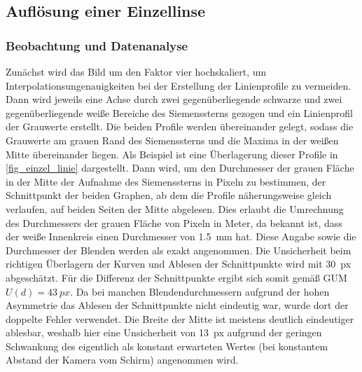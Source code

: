 \documentclass[
	a4paper,
	12pt,
	pagesize,
	ngerman
]{scrartcl}
\begin{document}
	\subsection{Auflösung einer Einzellinse} \label{ss_einzellinse}
	\subsubsection{Beobachtung und Datenanalyse}
	Zunächst wird das Bild um den Faktor vier hochskaliert, um Interpolationsungenauigkeiten bei der Erstellung der Linienprofile zu vermeiden.
	Dann wird jeweils eine Achse durch zwei gegenüberliegende schwarze und zwei gegenüberliegende weiße Bereiche des Siemenssterns gezogen und ein Linienprofil der Grauwerte erstellt.
	Die beiden Profile werden übereinander gelegt, sodass die Grauwerte am grauen Rand des Siemenssterns und die Maxima in der weißen Mitte  übereinander liegen.
	Als Beispiel ist eine Überlagerung dieser Profile in \cref{fig_einzel_linie} dargestellt.
	Dann wird, um den Durchmesser der grauen Fläche in der Mitte der Aufnahme des Siemenssterns in Pixeln zu bestimmen, der Schnittpunkt der beiden Graphen, ab dem die Profile näherungsweise gleich verlaufen, auf beiden Seiten der Mitte abgelesen.
	Dies erlaubt die Umrechnung des Durchmessers der grauen Fläche von Pixeln in Meter, da bekannt ist, dass der weiße Innenkreis einen Durchmesser von \SI{1,5}{mm} hat.
	Diese Angabe sowie die Durchmesser der Blenden werden als exakt angenommen.
	Die Unsicherheit beim richtigen Überlagern der Kurven und Ablesen der Schnittpunkte wird mit \SI{30}{px} abgeschätzt.
	Für die Differenz der Schnittpunkte ergibt sich somit gemäß GUM $U(d)= \SI{43}{px}$.
	Da bei manchen Blendendurchmessern aufgrund der hohen Asymmetrie das Ablesen der Schnittpunkte nicht eindeutig war, wurde dort der doppelte Fehler verwendet.
	Die Breite der Mitte ist meistens deutlich eindeutiger ablesbar, weshalb hier eine Unsicherheit von \SI{13}{px} aufgrund der geringen Schwankung des eigentlich als konstant erwarteten Wertes (bei konstantem Abstand der Kamera vom Schirm) angenommen wird.
	
\end{document}
